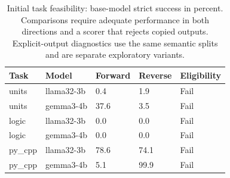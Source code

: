 \begin{table}[t]
\centering\small
\begin{tabular}{lllll}
\toprule
Task & Model & Forward & Reverse & Eligibility \\
\midrule
units & llama32-3b & 0.4 & 1.9 & Fail \\
units & gemma3-4b & 37.6 & 3.5 & Fail \\
logic & llama32-3b & 0.0 & 0.0 & Fail \\
logic & gemma3-4b & 0.0 & 0.0 & Fail \\
py\_cpp & llama32-3b & 78.6 & 74.1 & Fail \\
py\_cpp & gemma3-4b & 5.1 & 99.9 & Fail \\
\bottomrule
\end{tabular}
\caption{Initial task feasibility: base-model strict success in percent. Comparisons require adequate performance in both directions and a scorer that rejects copied outputs. Explicit-output diagnostics use the same semantic splits and are separate exploratory variants.}
\label{tab:domain-gates-snapshot}
\end{table}
